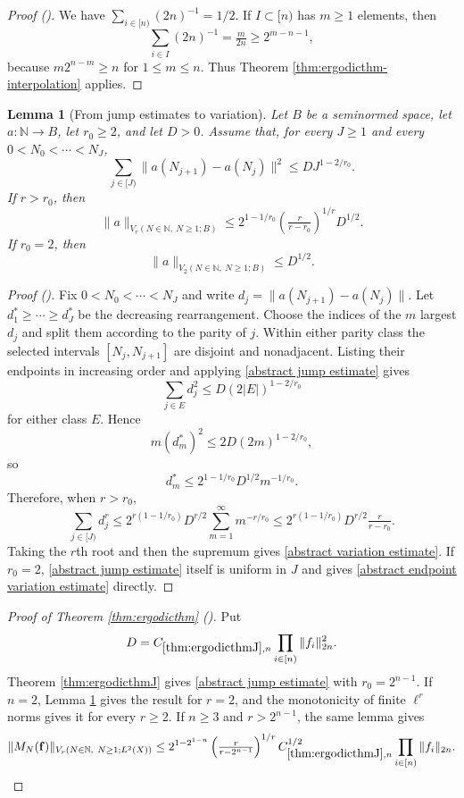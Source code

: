 \documentclass[12pt,reqno]{amsart}
\newcommand{\auto}{{({\tiny\faCar})}}
\theoremstyle{plain}
\newtheorem{lemma}[theorem]{Lemma}
\numberwithin{equation}{section}
\theoremstyle{remark}
\newcommand{\N}{{\mathbb N}}
\begin{document}
\begin{proof}[Proof \auto]
We have $\sum_{i\in[n)}(2n)^{-1}=1/2$. If $I\subset[n)$ has $m\ge1$ elements, then
\[
\sum_{i\in I}(2n)^{-1}=\tfrac{m}{2n}\ge2^{m-n-1},
\]
because $m2^{n-m}\ge n$ for $1\le m\le n$. Thus Theorem \ref{thm:ergodicthm-interpolation} applies.
\end{proof}

\begin{lemma}[From jump estimates to variation]\label{jump estimates imply variation}
Let $B$ be a seminormed space, let $a:\N\to B$, let $r_0\ge2$, and let $D>0$. Assume that, for every $J\ge1$ and every $0<N_0<\cdots<N_J$,
\begin{equation}\label{abstract jump estimate}
\sum_{j\in[J)}\|a(N_{j+1})-a(N_j)\|^2\le D J^{1-2/r_0}.
\end{equation}
If $r>r_0$, then
\begin{equation}\label{abstract variation estimate}
\|a\|_{V_r(N\in\N,\ N\ge1;B)}
\le 2^{1-1/r_0}\left(\tfrac{r}{r-r_0}\right)^{1/r}D^{1/2}.
\end{equation}
If $r_0=2$, then
\begin{equation}\label{abstract endpoint variation estimate}
\|a\|_{V_2(N\in\N,\ N\ge1;B)}\le D^{1/2}.
\end{equation}
\end{lemma}

\begin{proof}[Proof \auto]
Fix $0<N_0<\cdots<N_J$ and write $d_j=\|a(N_{j+1})-a(N_j)\|$. Let $d_1^*\ge\cdots\ge d_J^*$ be the decreasing rearrangement. Choose the indices of the $m$ largest $d_j$ and split them according to the parity of $j$. Within either parity class the selected intervals $[N_j,N_{j+1}]$ are disjoint and nonadjacent. Listing their endpoints in increasing order and applying \eqref{abstract jump estimate} gives
\[
\sum_{j\in E}d_j^2\le D(2|E|)^{1-2/r_0}
\]
for either class $E$. Hence
\[
m(d_m^*)^2\le 2D(2m)^{1-2/r_0},
\]
so
\[
d_m^*\le2^{1-1/r_0}D^{1/2}m^{-1/r_0}.
\]
Therefore, when $r>r_0$,
\[
\sum_{j\in[J)}d_j^r
\le2^{r(1-1/r_0)}D^{r/2}\sum_{m=1}^{\infty}m^{-r/r_0}
\le2^{r(1-1/r_0)}D^{r/2}\tfrac{r}{r-r_0}.
\]
Taking the $r$th root and then the supremum gives \eqref{abstract variation estimate}. If $r_0=2$, \eqref{abstract jump estimate} itself is uniform in $J$ and gives \eqref{abstract endpoint variation estimate} directly.
\end{proof}

\begin{proof}[Proof of Theorem \ref{thm:ergodicthm} \auto]
Put
\[
D=C_{\ref{thm:ergodicthmJ},n}\prod_{i\in[n)}\|f_i\|_{2n}^2.
\]
Theorem \ref{thm:ergodicthmJ} gives \eqref{abstract jump estimate} with $r_0=2^{n-1}$. If $n=2$, Lemma \ref{jump estimates imply variation} gives the result for $r=2$, and the monotonicity of finite $\ell^r$ norms gives it for every $r\ge2$. If $n\ge3$ and $r>2^{n-1}$, the same lemma gives
\[
\|M_N(\mathbf f)\|_{V_r(N\in\N,\ N\ge1;L^2(X))}
\le 2^{1-2^{1-n}}\left(\tfrac{r}{r-2^{n-1}}\right)^{1/r}
C_{\ref{thm:ergodicthmJ},n}^{1/2}
\prod_{i\in[n)}\|f_i\|_{2n}.
\]
\end{proof}
\end{document}
